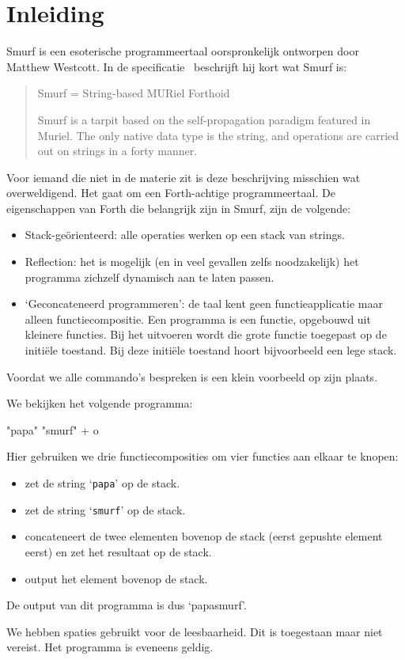 \section{Inleiding}
\label{sec:intro}

Smurf is een esoterische programmeertaal oorspronkelijk ontworpen door Matthew
Westcott. In de specificatie~\cite{safalra} beschrijft hij kort wat Smurf is:
\begin{quote}
	Smurf = String-based MURiel Forthoid

	Smurf is a tarpit based on the self-propagation paradigm featured in Muriel.
	The only native data type is the string, and operations are carried out on
	strings in a forty manner.
\end{quote}
Voor iemand die niet in de materie zit is deze beschrijving misschien wat
overweldigend. Het gaat om een Forth-achtige programmeertaal. De eigenschappen
van Forth die belangrijk zijn in Smurf, zijn de volgende:
\begin{itemize}
	\item Stack-geörienteerd: alle operaties werken op een stack van strings.
	\item Reflection: het is mogelijk (en in veel gevallen zelfs noodzakelijk)
		het programma zichzelf dynamisch aan te laten passen.
	\item `Geconcateneerd programmeren': de taal kent geen functieapplicatie maar
		alleen functiecompositie. Een programma is een functie, opgebouwd uit
		kleinere functies. Bij het uitvoeren wordt die grote functie toegepast op
		de initiële toestand. Bij deze initiële toestand hoort bijvoorbeeld een
		lege stack.
\end{itemize}
Voordat we alle commando's bespreken is een klein voorbeeld op zijn plaats.

\begin{exmp}
	We bekijken het volgende programma:
	\begin{smurf}"papa" "smurf" + o\end{smurf}
	Hier gebruiken we drie functiecomposities om vier functies aan elkaar te
	knopen:
	\begin{itemize}
		\item {} zet de string `\texttt{papa}' op de stack.
		\item {} zet de string `\texttt{smurf}' op de stack.
		\item \smurfinline{+} concateneert de twee elementen bovenop de stack
			(eerst gepushte element eerst) en zet het resultaat op de stack.
		\item {} output het element bovenop de stack.
	\end{itemize}
	De output van dit programma is dus `papasmurf'.

	We hebben spaties gebruikt voor de leesbaarheid. Dit is toegestaan maar niet
	vereist. Het programma  is eveneens geldig.
\end{exmp}

